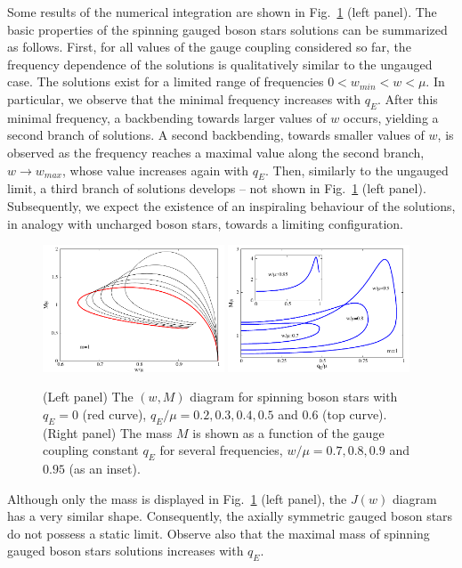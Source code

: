 Some results of the numerical integration are shown in Fig.~\ref{fig:w-M-gauged} (left panel).
The basic properties of the spinning gauged boson stars solutions can be summarized as follows.
First, for all values of the gauge coupling considered so far, 
the frequency dependence of the solutions is qualitatively similar to the ungauged case.
The solutions 
exist for a limited range of frequencies
$0<w_{min}<w<\mu$. 
In particular, we observe that the minimal frequency increases with $q_E$. 
After this minimal frequency, a backbending towards larger values of $w$ occurs, yielding a second branch of solutions. 
A second backbending, towards
smaller values of $w$,  is observed as the frequency reaches a maximal value along the second branch, $w\to w_{max}$, whose value increases again with $q_E$. 
Then, similarly to the ungauged limit, a third branch of solutions develops -- not shown in Fig.~\ref{fig:w-M-gauged} (left panel).
Subsequently, we expect the existence of an inspiraling behaviour of the solutions, 
in analogy with uncharged boson stars, towards a limiting configuration.  


\begin{figure}[H]
  \begin{center}
    \includegraphics[width=0.48\textwidth]{papers/KerrNewman/BS-w-M-gauged}
    \includegraphics[width=0.48\textwidth]{papers/KerrNewman/BS-g-M-gauged}
  \end{center}
  \caption{
	(Left panel)
	The $(w,M)$ diagram for spinning boson stars with $q_E=0$ (red curve), $q_E/\mu=0.2, 0.3, 0.4, 0.5$
	and $0.6$ (top curve).  
		(Right panel)
	The mass $M$ is shown as a function of the gauge coupling constant $q_E$
	for several frequencies, $w/\mu=0.7, 0.8, 0.9$ and $0.95$ (as an inset).	}
  \label{fig:w-M-gauged}
\end{figure}
Although only the mass is displayed in Fig.~\ref{fig:w-M-gauged} (left panel), the $J(w)$
diagram has a very similar shape.
Consequently,  the axially symmetric gauged boson stars do not possess
a static limit.  Observe also that the maximal mass of spinning gauged boson stars solutions increases with $q_E$.

